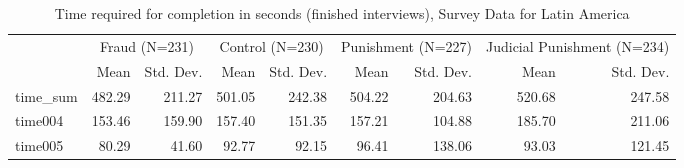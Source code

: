 \begin{table}

\caption{Time required for completion in seconds (finished interviews), Survey Data for Latin America}
\centering
\begin{tabular}[t]{lrrrrrrrr}
\toprule
\multicolumn{1}{c}{ } & \multicolumn{2}{c}{Fraud (N=231)} & \multicolumn{2}{c}{Control (N=230)} & \multicolumn{2}{c}{Punishment (N=227)} & \multicolumn{2}{c}{Judicial Punishment (N=234)} \\
\cmidrule(l{3pt}r{3pt}){2-3} \cmidrule(l{3pt}r{3pt}){4-5} \cmidrule(l{3pt}r{3pt}){6-7} \cmidrule(l{3pt}r{3pt}){8-9}
  & Mean & Std. Dev. & Mean & Std. Dev. & Mean & Std. Dev. & Mean & Std. Dev.\\
\midrule
time\_sum & 482.29 & 211.27 & 501.05 & 242.38 & 504.22 & 204.63 & 520.68 & 247.58\\
time004 & 153.46 & 159.90 & 157.40 & 151.35 & 157.21 & 104.88 & 185.70 & 211.06\\
time005 & 80.29 & 41.60 & 92.77 & 92.15 & 96.41 & 138.06 & 93.03 & 121.45\\
\bottomrule
\end{tabular}
\end{table}
